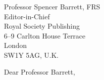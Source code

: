 \documentclass[10pt, a4paper]{letter} %
\begin{document}

\begin{letter}{
Professor Spencer Barrett, FRS\\
Editor-in-Chief\\
Royal Society Publishing\\
6--9 Carlton House Terrace\\
London\\
SW1Y 5AG, U.K.\\
}


\opening{Dear Professor Barrett,}







\end{letter}
\end{document}
